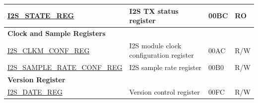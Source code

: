 \begin{longtable}{ | p{6cm} | p{7.2cm} | p{1.3cm} | p{1cm} | }
\hyperref[regdesc:I2SSTATEREG]{I2S\_STATE\_REG} & I2S TX status register & \hexprefix{}00BC & RO \\ \hline
\multicolumn{4}{|l|}{\textbf{Clock and Sample Registers}} \\ \hline
\hyperref[regdesc:I2SCLKMCONFREG]{I2S\_CLKM\_CONF\_REG} & I2S module clock configuration register & \hexprefix{}00AC & R/W \\ \hline
\hyperref[regdesc:I2SSAMPLERATECONFREG]{I2S\_SAMPLE\_RATE\_CONF\_REG} & I2S sample rate register & \hexprefix{}00B0 & R/W \\ \hline
\multicolumn{4}{|l|}{\textbf{Version Register}} \\ \hline
\hyperref[regdesc:I2SDATEREG]{I2S\_DATE\_REG} & Version control register & \hexprefix{}00FC & R/W \\ \hline
\end{longtable}
